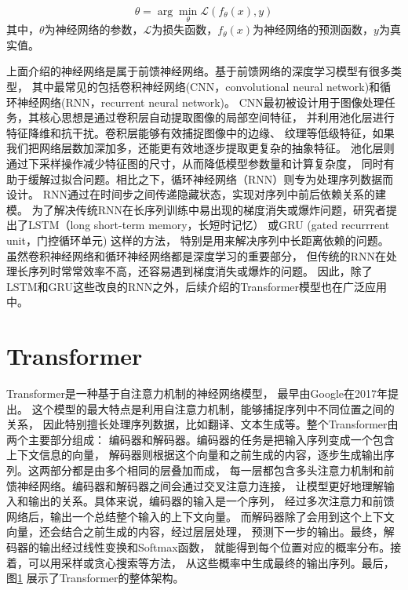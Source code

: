 \begin{equation}
  \theta = \arg\min_{\theta} \mathcal{L}(f_\theta(x), y)
\end{equation}
其中，$\theta$为神经网络的参数，$\mathcal{L}$为损失函数，$f_\theta(x)$为神经网络的预测函数，$y$为真实值。


上面介绍的神经网络是属于前馈神经网络。基于前馈网络的深度学习模型有很多类型，
其中最常见的包括卷积神经网络(CNN，convolutional neural network)和循环神经网络(RNN，recurrent neural network)。
CNN最初被设计用于图像处理任务，其核心思想是通过卷积层自动提取图像的局部空间特征，
并利用池化层进行特征降维和抗干扰。卷积层能够有效捕捉图像中的边缘、
纹理等低级特征，如果我们把网络层数加深加多，还能更有效地逐步提取更复杂的抽象特征。
池化层则通过下采样操作减少特征图的尺寸，从而降低模型参数量和计算复杂度，
同时有助于缓解过拟合问题。相比之下，循环神经网络（RNN）则专为处理序列数据而设计。
RNN通过在时间步之间传递隐藏状态，实现对序列中前后依赖关系的建模。
为了解决传统RNN在长序列训练中易出现的梯度消失或爆炸问题，研究者提出了LSTM（long short-term memory，长短时记忆）\cite{hochreiter1997long}
或GRU (gated recurrrent unit，门控循环单元) \cite{DBLP:journals/corr/ChoMGBSB14}这样的方法，
特别是用来解决序列中长距离依赖的问题。
虽然卷积神经网络和循环神经网络都是深度学习的重要部分，
但传统的RNN在处理长序列时常常效率不高，还容易遇到梯度消失或爆炸的问题。
因此，除了LSTM和GRU这些改良的RNN之外，后续介绍的Transformer模型也在广泛应用中。

\section{Transformer}\label{transformer}

Transformer是一种基于自注意力机制的神经网络模型，
最早由Google在2017年提出\cite{vaswani2017attention}。
这个模型的最大特点是利用自注意力机制，能够捕捉序列中不同位置之间的关系，
因此特别擅长处理序列数据，比如翻译、文本生成等。整个Transformer由两个主要部分组成：
编码器和解码器。编码器的任务是把输入序列变成一个包含上下文信息的向量，
解码器则根据这个向量和之前生成的内容，逐步生成输出序列。这两部分都是由多个相同的层叠加而成，
每一层都包含多头注意力机制和前馈神经网络。编码器和解码器之间会通过交叉注意力连接，
让模型更好地理解输入和输出的关系。具体来说，编码器的输入是一个序列，
经过多次注意力和前馈网络后，输出一个总结整个输入的上下文向量。
而解码器除了会用到这个上下文向量，还会结合之前生成的内容，经过层层处理，
预测下一步的输出。最终，解码器的输出经过线性变换和Softmax函数，
就能得到每个位置对应的概率分布。接着，可以用采样或贪心搜索等方法，
从这些概率中生成最终的输出序列。最后，图\ref{transformer}
展示了Transformer的整体架构。

